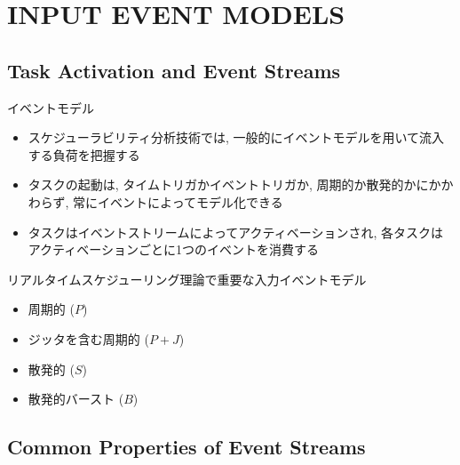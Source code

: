 
\section{INPUT EVENT MODELS}
\label{sec: input event models}

\subsection{Task Activation and Event Streams}
\label{ssec: task activation and event streams}

\begin{frame}{イベントモデル}
    \begin{itemize}
        \item スケジューラビリティ分析技術では, 一般的にイベントモデルを用いて流入する負荷を把握する
        \item タスクの起動は, タイムトリガかイベントトリガか, 周期的か散発的かにかかわらず, 常にイベントによってモデル化できる
        \item タスクはイベントストリームによってアクティベーションされ, 各タスクはアクティベーションごとに1つのイベントを消費する
    \end{itemize}
\end{frame}

\begin{frame}{リアルタイムスケジューリング理論で重要な入力イベントモデル}
    \begin{itemize}
        \item 周期的 ($P$)
        \item ジッタを含む周期的 ($P + J$)
        \item 散発的 ($S$)
        \item 散発的バースト ($B$)
    \end{itemize}
\end{frame}


\subsection{Common Properties of Event Streams}
\label{ssec: common properties of event streams}


